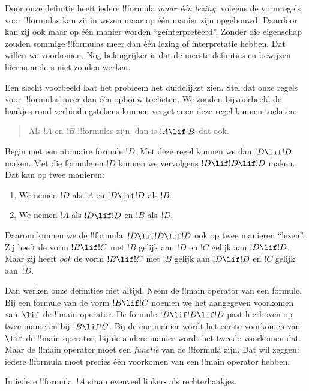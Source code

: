 \documentclass[openany]{memoir}
\begin{document}
\begin{explain}
Door onze definitie heeft iedere !!{formula} \emph{maar één lezing}:
volgens de vormregels voor !!{formula}s kan zij in wezen maar op één
manier zijn opgebouwd. Daardoor kan zij ook maar op één manier worden
``geïnterpreteerd''. Zonder die eigenschap zouden sommige !!{formula}s
meer dan één lezing of interpretatie hebben. Dat willen we voorkomen.
Nog belangrijker is dat de meeste definities en bewijzen hierna anders
niet zouden werken.

Een slecht voorbeeld laat het probleem het duidelijkst zien. Stel dat
onze regels voor !!{formula}s meer dan één opbouw toelieten. We zouden
bijvoorbeeld de haakjes rond verbindingstekens kunnen vergeten en deze
regel kunnen toelaten:
\begin{quote}
Als $!A$ en $!B$ !!{formula}s zijn, dan is $!A \lif !B$ dat ook.
\end{quote}
Begin met een atomaire formule $!D$. Met deze regel kunnen we dan $!D
\lif !D$ maken. Met die formule en $!D$ kunnen we vervolgens $!D \lif
!D \lif !D$ maken. Dat kan op twee manieren:
\begin{enumerate}
\item We nemen $!D$ als $!A$ en $!D \lif !D$ als $!B$.
\item We nemen $!A$ als $!D \lif !D$ en $!B$ als~$!D$.  
\end{enumerate}
Daarom kunnen we de !!{formula}~$!D \lif !D \lif !D$ ook op twee
manieren ``lezen''. Zij heeft de vorm $!B \lif !C$ met $!B$ gelijk aan
$!D$ en $!C$ gelijk aan $!D \lif !D$. Maar zij heeft \emph{ook} de vorm
$!B \lif !C$ met $!B$ gelijk aan $!D \lif !D$ en $!C$ gelijk aan~$!D$.

Dan werken onze definities niet altijd. Neem de !!{main operator} van
een formule. Bij een formule van de vorm $!B \lif !C$ noemen we het
aangegeven voorkomen van~$\lif$ de !!{main operator}. De formule $!D
\lif !D \lif !D$ past hierboven op twee manieren bij $!B \lif !C$.
Bij de ene manier wordt het eerste voorkomen van $\lif$ de !!{main
operator}; bij de andere manier wordt het tweede voorkomen dat. Maar
de !!{main operator} moet een \emph{functie} van de !!{formula} zijn.
Dat wil zeggen: iedere !!{formula} moet precies één voorkomen van een
!!{main operator} hebben.
\end{explain}

\begin{lem}
In iedere !!{formula}~$!A$ staan evenveel linker- als rechterhaakjes.
\end{lem}
\end{document}
